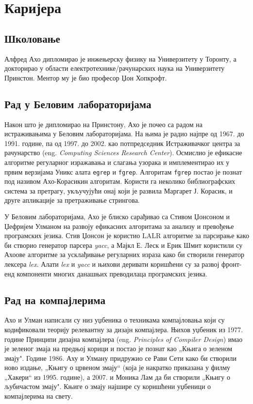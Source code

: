 \documentclass[a4paper]{article}
\begin{document}
\section{Каријера}
\label{sec:naslov1}
\subsection{Школовање}
\label{subsec:podnaslov1}

Алфред Ахо дипломирао је инжењерску физику на Универзитету у Торонту, а  докторирао у области електротехнике/рачунарских наука на Универзитету Принстон. Ментор му је био професор Џон Хопкрофт.

\subsection{Рад у Беловим лабораторијама}
\label{subsec:podnaslov2}
Након што је дипломирао на Принстону, Ахо је почео са радом на истраживањима у Беловим лабораторијама. На њима је радио најпре од 1967. до 1991. године, па од 1997. до 2002. као потпредседник Истраживачког центра за рачунарство (eng. \emph{Computing Sciences Research Center}). Осмислио је ефикасне алгоритме регуларног изражавања и слагања узорака и имплементирао их у првим верзијама Уникс алата \verb|egrep| и \verb|fgrep|. Алгоритам \verb|fgrep| постао је познат под називом Ахо-Корасикин алгоритам. Користи га неколико библиографских система за претрагу, укључујући онај који је развила Маргарет Ј. Корасик, и друге апликације за претраживање стрингова. 

У Беловим лабораторијама, Ахо је блиско сарађивао са Стивом Џонсоном и Џефријем Улманом на развоју ефикасних алгоритама за анализу и превођење програмских језика. Стив Џонсон је користио LALR алгоритме за парсирање како би створио генератор парсера \emph{yacc}, а Мајкл Е. Леск и Ерик Шмит користили су Ахоове алгоритме за усклађивање регуларних израза како би створили генератор лексера \emph{lex}. Алати \emph{lex} и \emph{yacc} и њихови деривати коришћени су за развој фронт-енд компоненти многих данашњих преводилаца програмских језика. 

\subsection{Рад на компајлерима}
\label{subsec:podnaslov3}
Ахо и Улман написали су низ уџбеника о техникама компајловања који су кодификовали теорију релевантну за дизајн компајлера. Њихов уџбеник из 1977. године Принципи дизајна компајлера (eng. \emph{Principles of Compiler Design}) имао је зеленог змаја на предњој корици и постао је познат као „Књига о зеленом змају". Године 1986. Аху и Улману придружио се Рави Сети како би створили ново издање, „Књигу о црвеном змају“ (која је накратко приказана у филму „Хакери“ из 1995. године), а 2007. и Моника Лам да би створили „Књигу о љубичастом змају". Књиге о змају најшире су коришћени уџбеници о компајлерима на свету. 
\end{document}
